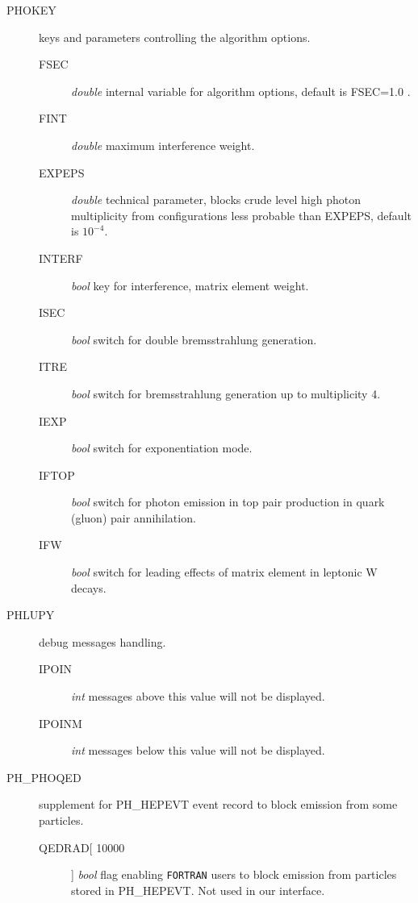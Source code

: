 \documentclass[]{Photos_interface_design}
\begin{document}
\begin{description}
\item[PHOKEY] keys and parameters controlling the algorithm options.
    \begin{description}
	\item[FSEC]   \textit{double} internal variable for algorithm options, default is FSEC=1.0\; .
	\item[FINT]   \textit{double} maximum interference weight.
	\item[EXPEPS] \textit{double} technical parameter, blocks crude level high photon multiplicity from configurations less probable than EXPEPS, default is $10^{-4}$.
	\item[INTERF] \textit{bool} key for interference, matrix element weight.
	\item[ISEC]   \textit{bool} switch for double bremsstrahlung generation.
	\item[ITRE]   \textit{bool} switch for bremsstrahlung generation up to multiplicity 4.
	\item[IEXP]   \textit{bool} switch for exponentiation mode.
	\item[IFTOP]  \textit{bool} switch for photon emission in top pair production in quark (gluon) pair annihilation.
	\item[IFW]    \textit{bool} switch for leading effects of matrix element in leptonic W decays.
    \end{description}
\end{description}

\begin{description}
\item[PHLUPY] debug messages handling.
    \begin{description}
    \item[IPOIN]  \textit{int} messages above this value will not be displayed.
	\item[IPOINM] \textit{int} messages below this value will not be displayed.
    \end{description}
\end{description}

\begin{description}
\item[PH\_PHOQED] supplement for PH\_HEPEVT event record to block emission 
from some particles.
    \begin{description}
    \item[QEDRAD[ 10000]]  \textit{bool} flag enabling {\tt FORTRAN} users
    to block emission from particles stored in PH\_HEPEVT. Not used in 
     our interface.
    \end{description}
\end{description}
\end{document}
